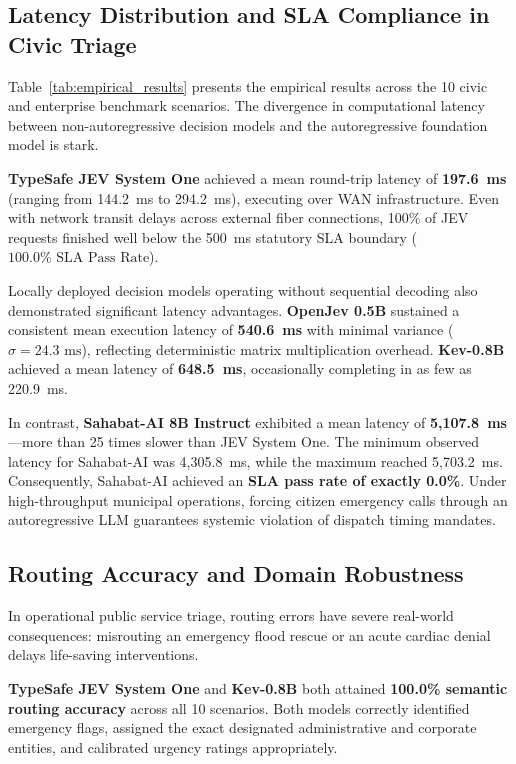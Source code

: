 \documentclass[journal,compsoc]{IEEEtran}
\begin{document}
\subsection{Latency Distribution and SLA Compliance in Civic Triage}
Table~\ref{tab:empirical_results} presents the empirical results across the 10 civic and enterprise benchmark scenarios. The divergence in computational latency between non-autoregressive decision models and the autoregressive foundation model is stark.

\textbf{TypeSafe JEV System One} achieved a mean round-trip latency of \textbf{197.6~ms} (ranging from 144.2~ms to 294.2~ms), executing over WAN infrastructure. Even with network transit delays across external fiber connections, 100\% of JEV requests finished well below the 500~ms statutory SLA boundary ($100.0\% \text{ SLA Pass Rate}$).

Locally deployed decision models operating without sequential decoding also demonstrated significant latency advantages. \textbf{OpenJev 0.5B} sustained a consistent mean execution latency of \textbf{540.6~ms} with minimal variance ($\sigma = 24.3 \text{ ms}$), reflecting deterministic matrix multiplication overhead. \textbf{Kev-0.8B} achieved a mean latency of \textbf{648.5~ms}, occasionally completing in as few as 220.9~ms.

In contrast, \textbf{Sahabat-AI 8B Instruct} exhibited a mean latency of \textbf{5,107.8~ms}—more than 25 times slower than JEV System One. The minimum observed latency for Sahabat-AI was 4,305.8~ms, while the maximum reached 5,703.2~ms. Consequently, Sahabat-AI achieved an \textbf{SLA pass rate of exactly 0.0\%}. Under high-throughput municipal operations, forcing citizen emergency calls through an autoregressive LLM guarantees systemic violation of dispatch timing mandates.

\subsection{Routing Accuracy and Domain Robustness}
In operational public service triage, routing errors have severe real-world consequences: misrouting an emergency flood rescue or an acute cardiac denial delays life-saving interventions.

\textbf{TypeSafe JEV System One} and \textbf{Kev-0.8B} both attained \textbf{100.0\% semantic routing accuracy} across all 10 scenarios. Both models correctly identified emergency flags, assigned the exact designated administrative and corporate entities, and calibrated urgency ratings appropriately.
\end{document}
